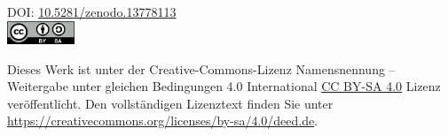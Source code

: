 \noindent DOI: \href{https://zenodo.org/records/13778113}{10.5281/zenodo.13778113}\\ %

\includegraphics[width=0.15\textwidth]{"Figures/by-sa.png"}\par\vspace{1cm}


\noindent Dieses Werk ist unter der Creative-Commons-Lizenz Namensnennung – Weitergabe unter gleichen Bedingungen 4.0 International \href{https://creativecommons.org/licenses/by-sa/4.0/}{CC BY-SA 4.0} Lizenz veröffentlicht. Den vollständigen Lizenztext finden Sie unter \href{https://creativecommons.org/licenses/by-sa/4.0/deed.de}{https://creativecommons.org/licenses/by-sa/4.0/deed.de}.\\ %


\newpage
{}
